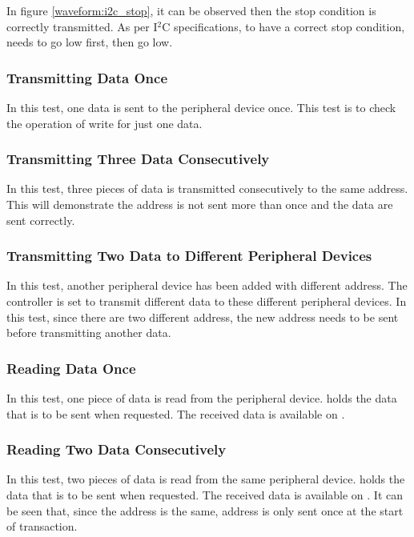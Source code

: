 \newpage
In figure \ref{waveform:i2c_stop}, it can be observed then the stop condition is correctly transmitted. As per I$^2$C specifications, to have a correct stop condition,  needs to go low first, then  go low.

\subsubsection{Transmitting Data Once}
In this test, one data is sent to the peripheral device once. This test is to check the operation of write for just one data.

\newpage
\subsubsection{Transmitting Three Data Consecutively}
In this test, three pieces of data is transmitted consecutively to the same address. This will demonstrate the address is not sent more than once and the data are sent correctly.

\subsubsection{Transmitting Two Data to Different Peripheral Devices}
In this test, another peripheral device has been added with different address. The controller is set to transmit different data to these different peripheral devices. In this test, since there are two different address, the new address needs to be sent before transmitting another data.

\subsubsection{Reading Data Once}
In this test, one piece of data is read from the peripheral device.  holds the data that is to be sent when requested. The received data is available on .

\newpage
\subsubsection{Reading Two Data Consecutively}
In this test, two pieces of data is read from the same peripheral device.  holds the data that is to be sent when requested. The received data is available on . It can be seen that, since the address is the same, address is only sent once at the start of transaction.

